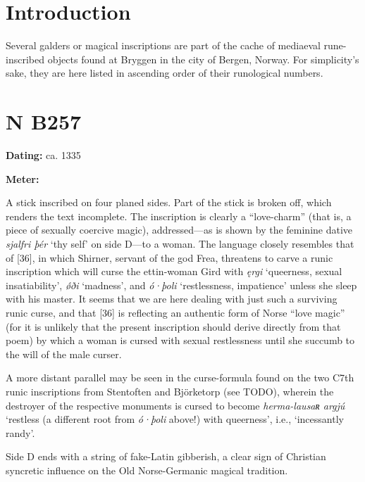 
\section{Introduction}

Several galders or magical inscriptions are part of the cache of mediaeval rune-inscribed objects found at Bryggen in the city of Bergen, Norway.  For simplicity’s sake, they are here listed in ascending order of their runological numbers.

\sectionline

\section{N B257}

\begin{flushright}%
\textbf{Dating:} ca. 1335

\textbf{Meter:} \Galdralag
\end{flushright}%

A stick inscribed on four planed sides.  Part of the stick is broken off, which renders the text incomplete.  The inscription is clearly a “love-charm” (that is, a piece of sexually coercive magic), addressed---as is shown by the feminine dative \emph{sjalfri þér} ‘thy self’ on side D---to a woman.
The language closely resembles that of [36], in which Shirner, servant of the god Frea, threatens to carve a runic inscription which will curse the ettin-woman Gird with \emph{ęrgi} ‘queerness, sexual insatiability’, \emph{ǿði} ‘madness’, and \emph{ó·þoli} ‘restlessness, impatience’ unless she sleep with his master.  It seems that we are here dealing with just such a surviving runic curse, and that [36] is reflecting an  authentic form of Norse “love magic” (for it is unlikely that the present inscription should derive directly from that poem) by which a woman is cursed with sexual restlessness until she succumb to the will of the male curser.

A more distant parallel may be seen in the curse-formula found on the two C7th runic inscriptions from Stentoften and Björketorp (see TODO), wherein the destroyer of the respective monuments is cursed to become \emph{herma-lausaʀ argjú} ‘restless (a different root from \emph{ó·þoli} above!) with queerness’, i.e., ‘incessantly randy’.

Side D ends with a string of fake-Latin gibberish, a clear sign of Christian syncretic influence on the Old Norse-Germanic magical tradition.

